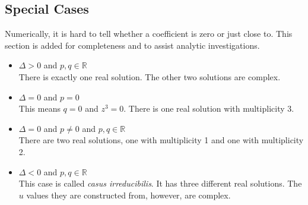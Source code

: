 \documentclass[12pt,a4paper,twoside,openright,BCOR10mm,headsepline,titlepage,abstracton,chapterprefix,final]{scrreprt}
\begin{document}
\subsection{Special Cases}
Numerically, it is hard to tell whether a coefficient is zero or just close to. This section is added for completeness and to assist analytic investigations.

\begin{itemize}
 \item $\Delta > 0$ and $p,q \in \mathbb{R}$\\
       There is exactly one real solution.
       The other two solutions are complex.
 \item $\Delta=0$ and $p=0$ \\
       This means $q=0$ and $z^3=0$.
       There is one real solution with multiplicity 3.
 \item $\Delta = 0$ and $p\neq0$ and $p,q\in\mathbb{R}$ \\
       There are two real solutions,
       one with multiplicity 1 and one with multiplicity 2.
 \item $\Delta < 0$ and $p,q \in \mathbb{R}$\\
       This case is called \emph{casus irreducibilis}.
       It has three different real solutions.
       The $u$ values they are constructed from, however,
       are complex.
\end{itemize}
\end{document}
